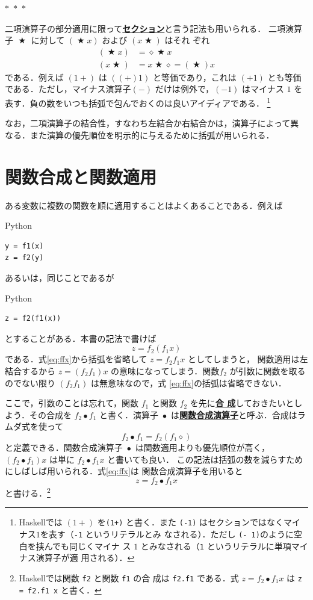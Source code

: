 \documentclass[a5paper,twoside,fleqn,draft]{jsbook}
\newcommand{\separator}{\begin{center}$*$~$*$~$*$\end{center}}
\newcommand{\programminglanguage}[1]{\textsf{#1}}
\newcommand{\haskell}{\programminglanguage{Haskell}}
\newcommand{\python}{\programminglanguage{Python}}
\newcommand{\keyword}[1]{{\underline{\textbf{#1}}}}
\newcommand{\code}[1]{\texttt{#1}}
\newenvironment{pythoncode}{\begin{itembox}[r]{\python}}{\end{itembox}}
\newcommand{\mAnonParam}{\diamond}
\DeclareMathOperator{\mBinOp}{\bigstar}
\DeclareMathOperator{\mComp}{\bullet}
\begin{document}
\separator

二項演算子の部分適用に限って\keyword{セクション}と言う記法も用いられる．
二項演算子 $\mBinOp$ に対して $(\mBinOp x)$ および $(x\mBinOp)$ はそれ
ぞれ
\begin{align}
  (\mBinOp x)
  &=\mAnonParam\mBinOp x\\
  (x\mBinOp)
  &=x\mBinOp\mAnonParam=(\mBinOp)x
\end{align}
である．例えば $(1+)$ は $((+)1)$ と等価であり，これは $(+1)$ とも等価
である．ただし，マイナス演算子$(-)$ だけは例外で，$(-1)$ はマイナス
$1$ を表す．負の数をいつも括弧で包んでおくのは良いアイディアである．
\footnote{\haskell では $(1+)$ を\code{(1+)} と書く．また \code{(-1)}
  はセクションではなくマイナス$1$を表す（\code{-1} というリテラルとみ
    なされる）．ただし \code{(- 1)}のように空白を挟んでも同じくマイナ
  ス $1$ とみなされる（\code{1} というリテラルに単項マイナス演算子が適
    用される）．}

なお，二項演算子の結合性，すなわち左結合か右結合かは，演算子によって異
なる．また演算の優先順位を明示的に与えるために括弧が用いられる．

\section{関数合成と関数適用}

ある変数に複数の関数を順に適用することはよくあることである．例えば
\begin{pythoncode}
\begin{verbatim}
y = f1(x)
z = f2(y)
\end{verbatim}
\end{pythoncode}
あるいは，同じことであるが
\begin{pythoncode}
\begin{verbatim}
z = f2(f1(x))
\end{verbatim}
\end{pythoncode}
とすることがある．本書の記法で書けば
\begin{equation}
  \label{eq:ffx}
  z=
  f_2(f_1x)
\end{equation}
である．式\eqref{eq:ffx}から括弧を省略して $z=f_2f_1x$ としてしまうと，
関数適用は左結合するから $z=(f_2f_1)x$ の意味になってしまう．関数$f_2$
が引数に関数を取るのでない限り $(f_2f_1)$ は無意味なので，式
\eqref{eq:ffx}の括弧は省略できない．

ここで，引数のことは忘れて，関数 $f_1$ と関数 $f_2$ を先に\keyword{合
  成}しておきたいとしよう．その合成を $f_2\mComp f_1$ と書く．演算子
$\mComp$ は\keyword{関数合成演算子}と呼ぶ．合成はラムダ式を使って
\begin{equation}
  f_2\mComp f_1
  =f_2(f_1\mAnonParam)
\end{equation}
と定義できる．関数合成演算子 $\mComp$ は関数適用よりも優先順位が高く，
$\left(f_2\mComp f_1\right)x$ は単に $f_2\mComp f_1x$ と書いても良い．
この記法は括弧の数を減らすためにしばしば用いられる．式\eqref{eq:ffx}は
関数合成演算子を用いると
\begin{equation}
  z
  =f_2\mComp f_1x
\end{equation}
と書ける．\footnote{\haskell では関数 \code{f2} と関数 \code{f1} の合
  成は \code{f2.f1} である．式 $z=f_2\mComp f_1x$ は \code{z = f2.f1
    x} と書く．}
\end{document}
